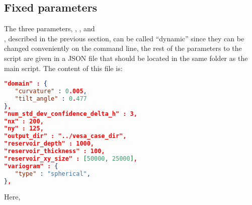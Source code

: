 \documentclass[11pt,a4paper]{amsart}
\begin{document}
\subsection{Fixed parameters}
The three parameters, \rangeX{}, \rangeY{}, and\\ \paramAmp{}, described in the
previous section, can be called ``dynamic'' 
since they can be changed conveniently on the command line, the rest of the
parameters to the script are given in a JSON file \jsonInputParamFile{} that
should be located in the same folder as the main script. The content of this
file is:
\begin{lstlisting}[language=json,firstnumber=1]
"domain" : {
   "curvature" : 0.005,
   "tilt_angle" : 0.477
},
"num_std_dev_confidence_delta_h" : 3, 
"nx" : 200,
"ny" : 125,
"output_dir" : "../vesa_case_dir",
"reservoir_depth" : 1000,
"reservoir_thickness" : 100,
"reservoir_xy_size" : [50000, 25000],
"variogram" : {
   "type" : "spherical",
},
\end{lstlisting}
Here,
\end{document}
